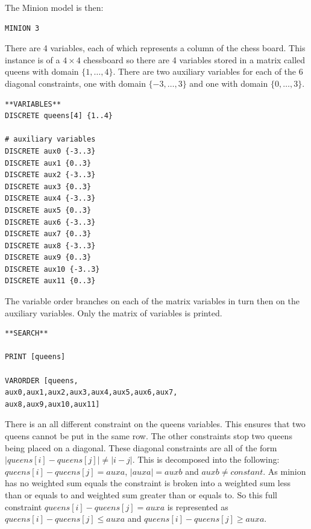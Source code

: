\documentclass[oneside]{book}
\begin{document}
The Minion model is then: 
\begin{verbatim}
MINION 3
\end{verbatim}

There are 4 variables, each of which represents a column of the chess board. This instance is of a $4 \times 4$ chessboard so there are 4 variables stored in a matrix called queens with domain $\{1,\ldots ,4\}$.  There are two auxiliary variables for each of the 6 diagonal constraints, one with domain $\{-3, \ldots ,3\}$ and one with domain $\{0, \ldots ,3\}$.

\begin{verbatim}
**VARIABLES**
DISCRETE queens[4] {1..4}

# auxiliary variables
DISCRETE aux0 {-3..3}
DISCRETE aux1 {0..3}
DISCRETE aux2 {-3..3}
DISCRETE aux3 {0..3}
DISCRETE aux4 {-3..3}
DISCRETE aux5 {0..3}
DISCRETE aux6 {-3..3}
DISCRETE aux7 {0..3}
DISCRETE aux8 {-3..3}
DISCRETE aux9 {0..3}
DISCRETE aux10 {-3..3}
DISCRETE aux11 {0..3}
\end{verbatim}

The variable order branches on each of the matrix variables in turn then on the
auxiliary variables. Only the matrix of variables is printed.
\begin{verbatim}
**SEARCH**

PRINT [queens]

VARORDER [queens,
aux0,aux1,aux2,aux3,aux4,aux5,aux6,aux7,
aux8,aux9,aux10,aux11]
\end{verbatim}

There is an all different constraint on the queens variables. This ensures that two queens cannot be put in the same row. The other constraints stop two queens being placed on a diagonal. These diagonal constraints are all of the form $|queens[i] - queens[j]| \ne |i - j|$.  This is decomposed into the following: $queens[i] - queens[j] = auxa$, $|auxa| = auxb$ and $auxb \ne constant$.  As minion has no weighted sum equals the constraint is broken into a weighted sum less than or equals to and weighted sum greater than or equals to. So this full constraint $queens[i] - queens[j] = auxa$  is represented as $queens[i] - queens[j] \leq auxa$ and $queens[i] - queens[j] \geq auxa$.
\end{document}
